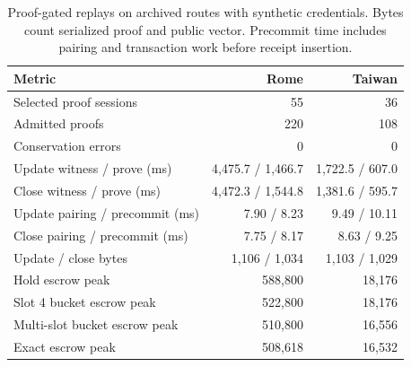\begin{table}[t]
\centering
\scriptsize
\setlength{\tabcolsep}{4pt}
\begin{tabular}{@{}lrr@{}}
\toprule
Metric & Rome & Taiwan \\
\midrule
Selected proof sessions & 55 & 36 \\
Admitted proofs & 220 & 108 \\
Conservation errors & 0 & 0 \\
Update witness / prove (ms) & 4,475.7 / 1,466.7 & 1,722.5 / 607.0 \\
Close witness / prove (ms) & 4,472.3 / 1,544.8 & 1,381.6 / 595.7 \\
Update pairing / precommit (ms) & 7.90 / 8.23 & 9.49 / 10.11 \\
Close pairing / precommit (ms) & 7.75 / 8.17 & 8.63 / 9.25 \\
Update / close bytes & 1,106 / 1,034 & 1,103 / 1,029 \\
\midrule
Hold escrow peak & 588,800 & 18,176 \\
Slot 4 bucket escrow peak & 522,800 & 18,176 \\
Multi-slot bucket escrow peak & 510,800 & 16,556 \\
Exact escrow peak & 508,618 & 16,532 \\
\bottomrule
\end{tabular}

\caption{Proof-gated replays on archived routes with synthetic credentials. Bytes count serialized proof and public vector. Precommit time includes pairing and transaction work before receipt insertion.}
\label{tab:corridors}
\end{table}
